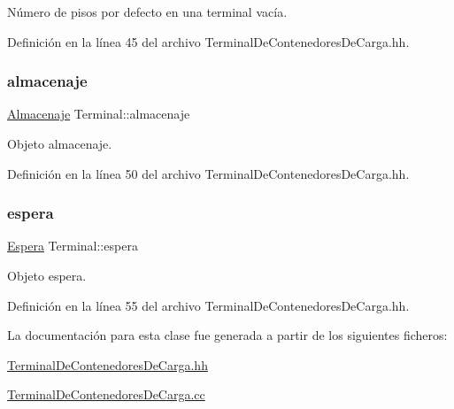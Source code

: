 Número de pisos por defecto en una terminal vacía. 



Definición en la línea 45 del archivo Terminal\+De\+Contenedores\+De\+Carga.\+hh.

\mbox{\label{class_terminal_a1d87d7b16c4f460eee6f1ab73da90fd2}} 
\subsubsection{\texorpdfstring{almacenaje}{almacenaje}}
{\footnotesize\ttfamily \hyperlink{class_almacenaje}{Almacenaje} Terminal\+::almacenaje\hspace{0.3cm}{\ttfamily [private]}}



Objeto almacenaje. 



Definición en la línea 50 del archivo Terminal\+De\+Contenedores\+De\+Carga.\+hh.

\mbox{\label{class_terminal_ac9f71207d73c8d05a9d9d6c046f9f8c3}} 
\subsubsection{\texorpdfstring{espera}{espera}}
{\footnotesize\ttfamily \hyperlink{class_espera}{Espera} Terminal\+::espera\hspace{0.3cm}{\ttfamily [private]}}



Objeto espera. 



Definición en la línea 55 del archivo Terminal\+De\+Contenedores\+De\+Carga.\+hh.



La documentación para esta clase fue generada a partir de los siguientes ficheros\+:\begin{DoxyCompactItemize}
\item 
\hyperlink{_terminal_de_contenedores_de_carga_8hh}{Terminal\+De\+Contenedores\+De\+Carga.\+hh}\item 
\hyperlink{_terminal_de_contenedores_de_carga_8cc}{Terminal\+De\+Contenedores\+De\+Carga.\+cc}\end{DoxyCompactItemize}

